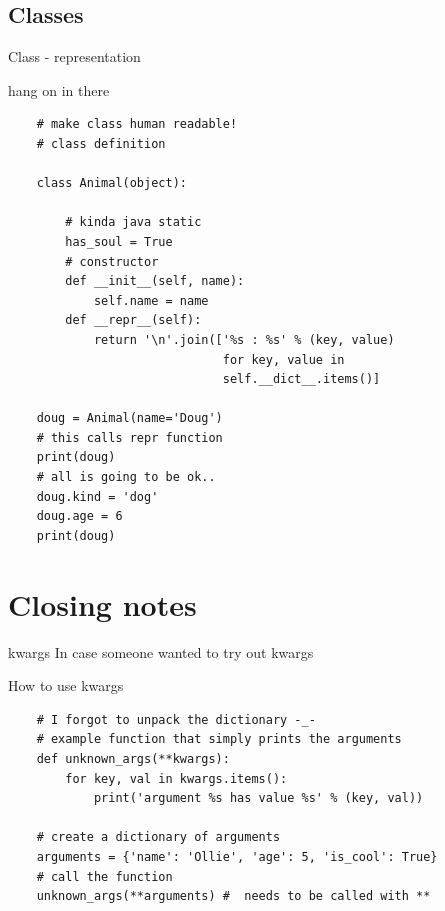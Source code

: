 \documentclass{bredelebeamer}
\begin{document}
\subsection{Classes}

\begin{frame}[fragile]{Class - representation}
  \begin{exampleblock}{hang on in there}
    \begin{lstlisting}
    # make class human readable!
    # class definition
    
    class Animal(object):
        
        # kinda java static
        has_soul = True
        # constructor
        def __init__(self, name):
            self.name = name
        def __repr__(self):
            return '\n'.join(['%s : %s' % (key, value) 
                              for key, value in 
                              self.__dict__.items()]
    
    doug = Animal(name='Doug')
    # this calls repr function
    print(doug)
    # all is going to be ok..
    doug.kind = 'dog'
    doug.age = 6
    print(doug)
    \end{lstlisting}
  \end{exampleblock}
\end{frame}

\section{Closing notes}

\begin{frame}[fragile]{kwargs}
  In case someone wanted to try out kwargs
  \begin{exampleblock}{How to use kwargs}
    \begin{lstlisting}
    # I forgot to unpack the dictionary -_-
    # example function that simply prints the arguments
    def unknown_args(**kwargs):
        for key, val in kwargs.items():
            print('argument %s has value %s' % (key, val))

    # create a dictionary of arguments
    arguments = {'name': 'Ollie', 'age': 5, 'is_cool': True}
    # call the function
    unknown_args(**arguments) #  needs to be called with **
    \end{lstlisting}
  \end{exampleblock}
\end{frame}
\end{document}
